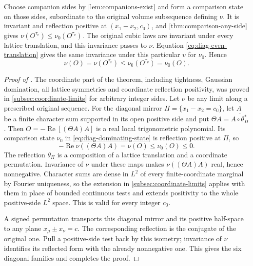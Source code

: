 Choose companion sides by \cref{lem:companions-exist} and form a
comparison state on those sides, subordinate to the original volume
subsequence defining $\nu$. It is invariant and reflection positive
at $(x_1-x_2,c_0)$,
and \cref{thm:comparison-any-side} gives
$\nu(O^{\tau_v})\le\nu_0(O^{\tau_v})$. The original cubic
laws are invariant under every lattice translation, and
this invariance passes to $\nu$. Equation
\eqref{eq:diag-even-translation} gives the same invariance
under this particular $v$ for $\nu_0$. Hence
\begin{equation}\label{eq:diag-dominating-state}
 \nu(O)=\nu(O^{\tau_v})
       \le\nu_0(O^{\tau_v})=\nu_0(O).
\end{equation}

\begin{proof}[Proof of ]

The coordinate part of the theorem, including tightness, Gaussian
domination, all lattice symmetries and coordinate reflection positivity,
was proved in \cref{subsec:coordinate-limits} for arbitrary integer
sides. Let $\nu$ be any limit along a prescribed original sequence.
For the diagonal mirror $\Pi=\{x_1-x_2=c_0\}$, let $A$ be a
finite character sum supported in its open positive side and put
$\Theta A=\overline{A\circ\theta_\Pi^*}$.
Then $O=-\operatorname{Re}[(\Theta A)A]$ is a real local
trigonometric polynomial. Its comparison state $\nu_0$ in
\eqref{eq:diag-dominating-state} is reflection positive at $\Pi$, so
\[
 -\operatorname{Re}\nu((\Theta A)A)=\nu(O)\le\nu_0(O)\le0.
\]
The reflection $\theta_\Pi$ is a composition of a lattice translation
and a coordinate permutation. Invariance of $\nu$ under these
maps makes $\nu((\Theta A)A)$ real, hence nonnegative.
Character sums are dense in $L^2$ of every finite-coordinate
marginal by Fourier uniqueness, so the extension in
\cref{subsec:coordinate-limits} applies with them in place of
bounded continuous tests and extends positivity to the whole
positive-side $L^2$ space. This is valid for every integer $c_0$.

A signed permutation transports this diagonal mirror
and its positive half-space to any plane
$x_\mu\pm x_\nu=c$. The corresponding reflection is the
conjugate of the original one. Pull a positive-side test
back by this isometry; invariance of $\nu$ identifies
its reflected form with the already nonnegative one.
This gives the six diagonal families and completes
the proof.
\end{proof}

\printbibliography

